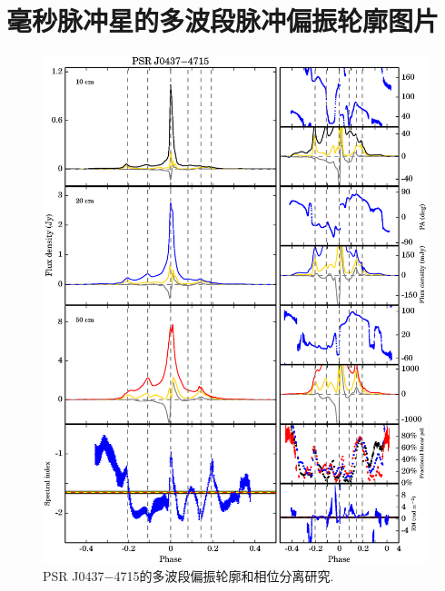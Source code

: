 
\chapter{毫秒脉冲星的多波段脉冲偏振轮廓图片}

\begin{figure}
\begin{center}
\includegraphics[width=6 in]{0437.ps}
\caption{PSR J0437$-$4715的多波段偏振轮廓和相位分离研究.}
\label{0437}
\end{center}
\end{figure}

